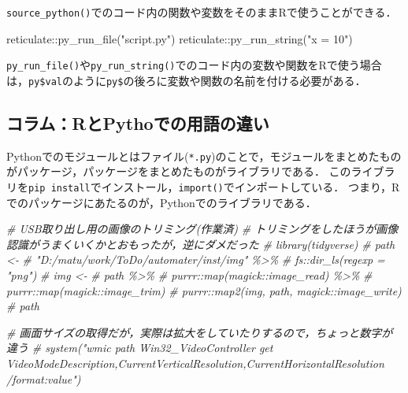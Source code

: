 \documentclass[
]{article}
\newenvironment{Shaded}{\begin{snugshade}}{\end{snugshade}}
\newcommand{\CommentTok}[1]{\textcolor[rgb]{0.56,0.35,0.01}{\textit{#1}}}
\newcommand{\FunctionTok}[1]{\textcolor[rgb]{0.00,0.00,0.00}{#1}}
\newcommand{\NormalTok}[1]{#1}
\newcommand{\SpecialCharTok}[1]{\textcolor[rgb]{0.00,0.00,0.00}{#1}}
\newcommand{\StringTok}[1]{\textcolor[rgb]{0.31,0.60,0.02}{#1}}
\begin{document}
\texttt{source\_python()}でのコード内の関数や変数をそのままRで使うことができる．

\begin{Shaded}
\begin{Highlighting}[]
\NormalTok{reticulate}\SpecialCharTok{::}\FunctionTok{py\_run\_file}\NormalTok{(}\StringTok{"script.py"}\NormalTok{)}
\NormalTok{reticulate}\SpecialCharTok{::}\FunctionTok{py\_run\_string}\NormalTok{(}\StringTok{"x = 10"}\NormalTok{)}
\end{Highlighting}
\end{Shaded}

\texttt{py\_run\_file()}や\texttt{py\_run\_string()}でのコード内の変数や関数をRで使う場合は，\texttt{py\$val}のように\texttt{py\$}の後ろに変数や関数の名前を付ける必要がある．

\hypertarget{ux30b3ux30e9ux30e0rux3068pythoux3067ux306eux7528ux8a9eux306eux9055ux3044}{%
\subsection{コラム：RとPythoでの用語の違い}\label{ux30b3ux30e9ux30e0rux3068pythoux3067ux306eux7528ux8a9eux306eux9055ux3044}}

Pythonでのモジュールとはファイル(\texttt{*.py})のことで，モジュールをまとめたものがパッケージ，パッケージをまとめたものがライブラリである．
このライブラリを\texttt{pip\ install}でインストール，\texttt{import()}でインポートしている．
つまり，Rでのパッケージにあたるのが，Pythonでのライブラリである．

\begin{Shaded}
\begin{Highlighting}[]
  \CommentTok{\# USB取り出し用の画像のトリミング(作業済)}
  \CommentTok{\#   トリミングをしたほうが画像認識がうまくいくかとおもったが，逆にダメだった}
  \CommentTok{\# library(tidyverse)}
  \CommentTok{\# path \textless{}{-} }
  \CommentTok{\#   "D:/matu/work/ToDo/automater/inst/img" \%\textgreater{}\%}
  \CommentTok{\#   fs::dir\_ls(regexp = "png") }
  \CommentTok{\# img \textless{}{-} }
  \CommentTok{\#   path \%\textgreater{}\%}
  \CommentTok{\#   purrr::map(magick::image\_read) \%\textgreater{}\%}
  \CommentTok{\#   purrr::map(magick::image\_trim)}
  \CommentTok{\# purrr::map2(img, path, magick::image\_write)}
  \CommentTok{\# path}
\end{Highlighting}
\end{Shaded}

\begin{Shaded}
\begin{Highlighting}[]
  \CommentTok{\# 画面サイズの取得だが，実際は拡大をしていたりするので，ちょっと数字が違う}
  \CommentTok{\# system("wmic path Win32\_VideoController get VideoModeDescription,CurrentVerticalResolution,CurrentHorizontalResolution /format:value")}
\end{Highlighting}
\end{Shaded}
\end{document}
